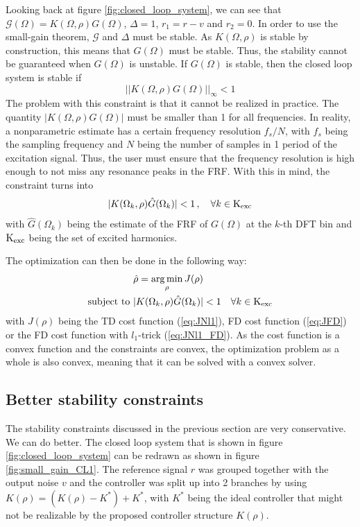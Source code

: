 Looking back at figure \ref{fig:closed_loop_system}, we can see that $\mathcal{G}(\Omega) = K(\Omega,\rho) G(\Omega)$, $\Delta = 1$, $r_1 = r - v$ and $r_2 = 0$. In order to use the small-gain theorem, $\mathcal{G}$ and $\Delta$ must be stable. As $K(\Omega,\rho)$ is stable by construction, this means that $G(\Omega)$ must be stable. Thus, the stability cannot be guaranteed when $G(\Omega)$ is unstable. If $G(\Omega)$ is stable, then the closed loop system is stable if
\begin{equation*}
||K(\Omega,\rho) G(\Omega)||_\infty < 1
\end{equation*}
The problem with this constraint is that it cannot be realized in practice. The quantity $|K(\Omega,\rho) G(\Omega)|$ must be smaller than 1 for all frequencies. In reality, a nonparametric estimate has a certain frequency resolution $f_s/N$, with $f_s$ being the sampling frequency and $N$ being the number of samples in 1 period of the excitation signal. Thus, the user must ensure that the frequency resolution is high enough to not miss any resonance peaks in the FRF. With this in mind, the constraint turns into
\begin{equation*}
|K(\Omega_k,\rho) \hat{G}(\Omega_k)| < 1 \,, \quad \forall k \in \text{K}_{\text{exc}}
\end{equation*}
with $\hat{G}(\Omega_k)$ being the estimate of the FRF of $G(\Omega)$ at the $k$-th DFT bin and $\text{K}_{\text{exc}}$ being the set of excited harmonics.

The optimization can then be done in the following way:
\begin{align*}
	&\hat{\rho} = \underset{\rho}{\mathrm{arg\,min}} \, J(\rho) \\
	\text{subject to } &|K(\Omega_k,\rho) \hat{G}(\Omega_k)| < 1 \quad \forall k \in \text{K}_{\text{exc}}
\end{align*}
with $J(\rho)$ being the TD cost function (\ref{eq:JNl1}), FD cost function (\ref{eq:JFD}) or the FD cost function with $l_1$-trick (\ref{eq:JNl1_FD}). As the cost function is a convex function and the constraints are convex, the optimization problem as a whole is also convex, meaning that it can be solved with a convex solver.

\subsection{Better stability constraints}
The stability constraints discussed in the previous section are very conservative. We can do better. The closed loop system that is shown in figure \ref{fig:closed_loop_system} can be redrawn as shown in figure \ref{fig:small_gain_CL1}. The reference signal $r$ was grouped together with the output noise $v$ and the controller was split up into 2 branches by using $K(\rho) = (K(\rho) - K^*) + K^*$, with $K^*$ being the ideal controller that might not be realizable by the proposed controller structure $K(\rho)$.

